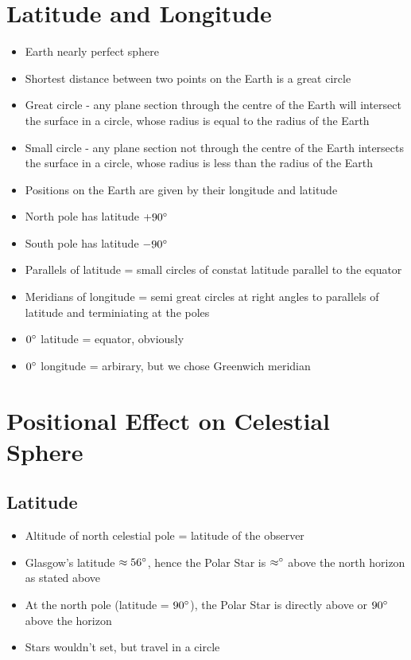 \documentclass[a4paper, 11pt]{article}
\begin{document}
\section{Latitude and Longitude}
\begin{itemize}
\item Earth nearly perfect sphere
\item Shortest distance between two points on the Earth is a great circle
\item Great circle - any plane section through the centre of the Earth will intersect the surface in a circle, whose radius is equal to the radius of the Earth
\item Small circle - any plane section not through the centre of the Earth intersects the surface in a circle, whose radius is less than the radius of the Earth
\item Positions on the Earth are given by their longitude and latitude
\item North pole has latitude \(+90\degree\)
\item South pole has latitude \(-90\degree\)
\item Parallels of latitude = small circles of constat latitude parallel to the equator
\item Meridians of longitude = semi great circles at right angles to parallels of latitude and terminiating at the poles
\item \(0\degree\) latitude = equator, obviously
\item \(0\degree\) longitude = arbirary, but we chose Greenwich meridian
\end{itemize}

\section{Positional Effect on Celestial Sphere}
	\subsection{Latitude}
	\begin{itemize}
	\item Altitude of north celestial pole = latitude of the observer
	\item Glasgow's latitude \(\approx56\degree\), hence the Polar Star is \(\approx\degree\) above the north horizon as stated above
	\item At the north pole (latitude = \(90\degree\)), the Polar Star is directly above or \(90\degree\) above the horizon
	\item Stars wouldn't set, but travel in a circle
	\end{itemize}
\end{document}
